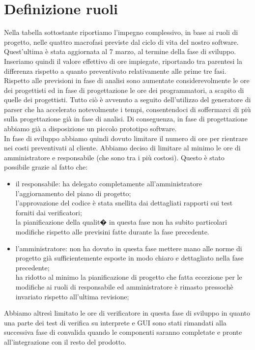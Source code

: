 \section{Definizione ruoli}
Nella tabella sottostante riportiamo l'impegno complessivo, in base ai ruoli di progetto, nelle quattro macrofasi previste dal ciclo di vita del nostro software. Quest'ultima
\`e stata aggiornata al 7 marzo, al termine della fase di sviluppo. Inseriamo quindi il valore effettivo di ore impiegate, riportando tra parentesi la differenza rispetto a quanto preventivato relativamente alle prime tre fasi. \\
Rispetto alle previsioni in fase di analisi sono aumentate considerevolmente 
le ore dei progettisti ed in fase di progettazione le ore 
dei programmatori, a scapito di quelle dei progettisti. Tutto ci\`o \`e avvenuto a seguito dell'utilizzo del generatore di parser che ha accelerato notevolmente i tempi, consentendoci di soffermarci di pi\`u sulla progettazione gi\`a in fase di analisi. Di conseguenza, in fase di progettazione abbiamo gi\`a a disposizione un piccolo prototipo software. 
\\In fase di sviluppo abbiamo quindi dovuto limitare il numero di ore per rientrare nei costi preventivati al cliente. Abbiamo deciso di limitare al minimo le ore di amministratore e responsabile (che sono tra i pi\`u costosi). Questo \`e stato possibile grazie al fatto che:
\begin{itemize}
\item il responsabile: ha delegato completamente all'amministratore l'aggiornamento del piano di progetto; 
\\l'approvazione del codice \`e stata snellita dai dettagliati rapporti sui test forniti dai verificatori; 
\\la pianificazione della qualit� in questa fase non ha subito particolari modifiche rispetto alle previsini fatte durante la fase precedente.
\item l'amministratore: non ha dovuto in questa fase mettere mano alle norme di progetto gi\`a sufficientemente esposte in modo chiaro e dettagliato nella fase precedente; 
\\ha ridotto al minimo la pianificazione di progetto che fatta eccezione per le modifiche ai ruoli di responsabile ed amministratore \`e rimasto pressoch\`e invariato rispetto all'ultima revisione;
\end{itemize}
Abbiamo altres\`i limitato le ore di verificatore in questa fase di sviluppo in quanto una parte dei test di verifica su interprete e GUI sono stati rimandati alla successiva fase di convalida quando le componenti saranno completate e pronte all'integrazione con il resto del prodotto.

